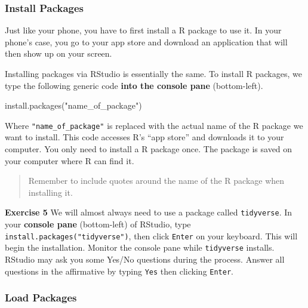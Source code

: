 \documentclass[
]{book}
\makeatletter
\newenvironment{Shaded}{\begin{snugshade}}{\end{snugshade}}
\newcommand{\FunctionTok}[1]{\textcolor[rgb]{0,0,0}{#1}}
\newcommand{\NormalTok}[1]{#1}
\newcommand{\StringTok}[1]{\textcolor[rgb]{0.5,0.5,0.5}{#1}}
\newenvironment{kframe}{%
\medskip{}
\setlength{\fboxsep}{.8em}
 \def\at@end@of@kframe{}%
 \ifinner\ifhmode%
  \def\at@end@of@kframe{\end{minipage}}%
  \begin{minipage}{\columnwidth}%
 \fi\fi%
 \def\FrameCommand##1{\hskip\@totalleftmargin \hskip-\fboxsep
 \colorbox{shadecolor}{##1}\hskip-\fboxsep
     \hskip-\linewidth \hskip-\@totalleftmargin \hskip\columnwidth}%
 \MakeFramed {\advance\hsize-\width
   \@totalleftmargin\z@ \linewidth\hsize
   \@setminipage}}%
 {\par\unskip\endMakeFramed%
 \at@end@of@kframe}
\renewenvironment{Shaded}{\begin{kframe}}{\end{kframe}}
\newenvironment{rmdblock}[1]
  {\begin{shaded*}
  }
  {\end{shaded*}
  }
\newenvironment{learncheck}
  {\begin{rmdblock}{warning}}
  {\end{rmdblock}}
\makeatother
\begin{document}
\hypertarget{install-packages}{%
\subsubsection*{Install Packages}\label{install-packages}}

Just like your phone, you have to first install a R package to use it. In your phone's case, you go to your app store and download an application that will then show up on your screen.

Installing packages via RStudio is essentially the same. To install R packages, we type the following generic code \textbf{into the console pane} (bottom-left).

\begin{Shaded}
\begin{Highlighting}[]
\FunctionTok{install.packages}\NormalTok{(}\StringTok{"name\_of\_package"}\NormalTok{)}
\end{Highlighting}
\end{Shaded}

Where \texttt{"name\_of\_package"} is replaced with the actual name of the R package we want to install. This code accesses R's ``app store'' and downloads it to your computer. You only need to install a R package once. The package is saved on your computer where R can find it.

\begin{quote}
Remember to include quotes around the name of the R package when installing it.
\end{quote}

\begin{learncheck}
\textbf{Exercise 5} We will almost always need to use a package called
\texttt{tidyverse}. In your \textbf{console pane} (bottom-left) of
RStudio, type \texttt{install.packages("tidyverse")}, then click
\texttt{Enter} on your keyboard. This will begin the installation.
Monitor the console pane while \texttt{tidyverse} installs. RStudio may
ask you some Yes/No questions during the process. Answer all questions
in the affirmative by typing \texttt{Yes} then clicking \texttt{Enter}.
\end{learncheck}

\hypertarget{load-packages}{%
\subsubsection*{Load Packages}\label{load-packages}}
\end{document}

